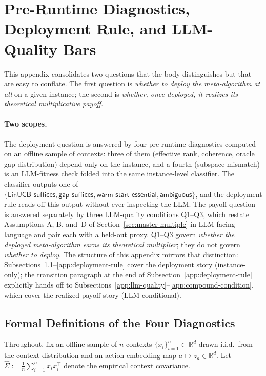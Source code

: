 \documentclass{article}
\theoremstyle{definition}
\theoremstyle{remark}
\theoremstyle{remark}
\begin{document}
\section{Pre-Runtime Diagnostics, Deployment Rule, and LLM-Quality Bars}
\label{app:diagnostics}

This appendix consolidates two questions that the body distinguishes
but that are easy to conflate. The first question is \emph{whether to
deploy the meta-algorithm at all} on a given instance; the second is
\emph{whether, once deployed, it realizes its theoretical
multiplicative payoff}.

\paragraph{Two scopes.}
The deployment question is answered by four pre-runtime diagnostics
computed on an offline sample of contexts: three of them
(effective rank, coherence, oracle gap distribution) depend only on
the instance, and a fourth (subspace mismatch) is an LLM-fitness check
folded into the same instance-level classifier. The classifier outputs
one of $\{\textsf{LinUCB-suffices}, \textsf{gap-suffices},
\textsf{warm-start-essential}, \textsf{ambiguous}\}$, and the
deployment rule reads off this output without ever inspecting the LLM.
The payoff question is answered separately by three LLM-quality
conditions Q1--Q3, which restate Assumptions A, B, and~D of
Section~\ref{sec:master-multiple} in LLM-facing language and pair each
with a held-out proxy. Q1--Q3 govern \emph{whether the deployed
meta-algorithm earns its theoretical multiplier}; they do not govern
\emph{whether to deploy}.
The structure of this appendix mirrors that distinction:
Subsections~\ref{app:diag-defs}--\ref{app:deployment-rule} cover the
deployment story (instance-only); the transition paragraph at the end
of Subsection~\ref{app:deployment-rule} explicitly hands off to
Subsections~\ref{app:llm-quality}--\ref{app:compound-condition}, which
cover the realized-payoff story (LLM-conditional).

\subsection{Formal Definitions of the Four Diagnostics}
\label{app:diag-defs}

Throughout, fix an offline sample of $n$ contexts
$\{x_i\}_{i=1}^n\subset\mathbb R^d$ drawn i.i.d.\ from the context
distribution and an action embedding map $a\mapsto z_a\in\mathbb R^d$.
Let $\widehat\Sigma := \frac{1}{n}\sum_{i=1}^n x_i x_i^\top$ denote
the empirical context covariance.
\end{document}
